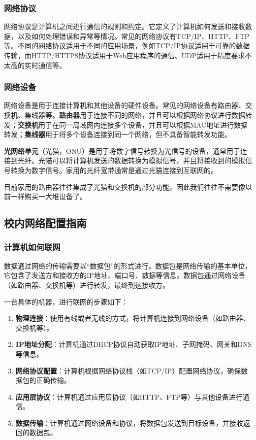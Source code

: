 \subsubsection{网络协议}

网络协议是计算机之间进行通信的规则和约定。它定义了计算机如何发送和接收数据，以及如何处理错误和异常等情况。常见的网络协议有TCP/IP、HTTP、FTP等。不同的网络协议适用于不同的应用场景，例如TCP/IP协议适用于可靠的数据传输，而HTTP/HTTPS协议适用于Web应用程序的通信、UDP适用于精度要求不太高的实时通信等。

\subsubsection{网络设备}

网络设备是用于连接计算机和其他设备的硬件设备。常见的网络设备有路由器、交换机、集线器等。\textbf{路由器}用于连接不同的网络，并且可以根据网络协议进行数据转发；\textbf{交换机}用于在同一局域网内连接多个设备，并且可以根据MAC地址进行数据转发；\textbf{集线器}用于将多个设备连接到同一个网络，但不具备智能转发功能。

\textbf{光网络单元}（光猫，ONU）是用于将数字信号转换为光信号的设备，通常用于连接到光纤。光猫可以将计算机发送的数据转换为模拟信号，并且将接收到的模拟信号转换为数字信号。家用的光纤宽带通常是通过光猫连接到互联网的。

目前家用的路由器往往集成了光猫和交换机的部分功能，因此我们往往不需要像以前一样购买一大堆设备了。

\subsection{校内网络配置指南}

\subsubsection{计算机如何联网}

数据通过网络的传输需要以“数据包”的形式进行。数据包是网络传输的基本单位，它包含了发送方和接收方的IP地址、端口号、数据等信息。数据包通过网络设备（如路由器、交换机等）进行转发，最终到达接收方。

一台具体的机器，进行联网的步骤如下：
\begin{enumerate}
  \item \textbf{物理连接}：使用有线或者无线的方式，将计算机连接到网络设备（如路由器、交换机等）。
  \item \textbf{IP地址分配}：计算机通过DHCP协议自动获取IP地址、子网掩码、网关和DNS等信息。
  \item \textbf{网络协议配置}：计算机根据网络协议栈（如TCP/IP）配置网络协议，确保数据包的正确传输。
  \item \textbf{应用层协议}：计算机通过应用层协议（如HTTP、FTP等）与其他设备进行通信。
  \item \textbf{数据传输}：计算机通过网络设备和协议，将数据包发送到目标设备，并接收返回的数据包。
\end{enumerate}


